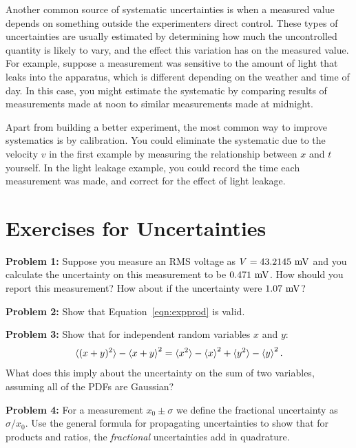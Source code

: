 \documentclass[12pt,oneside]{book}
\begin{document}
Another common source of systematic uncertainties is when a measured value depends on something outside the experimenters direct control.   These types of uncertainties are usually estimated by determining how much the uncontrolled quantity is likely to vary, and the effect this variation has on the measured value.  For example, suppose a measurement was sensitive to the amount of light that leaks into the apparatus, which is different depending on the weather and time of day.  In this case, you might estimate the systematic by comparing results of measurements made at noon to similar measurements made at midnight.

Apart from building a better experiment, the most common way to improve systematics is by calibration.  You could eliminate the systematic due to the velocity $v$ in the first example by measuring the relationship between $x$ and $t$ yourself.  In the light leakage example, you could record the time each measurement was made, and correct for the effect of light leakage.  

\section{Exercises for Uncertainties}


\noindent
{\bf Problem 1:}  Suppose you measure an RMS voltage as $V = 43.2145~\rm mV$ and you calculate the uncertainty on this measurement to be $0.471~\rm mV$.  How should you report this measurement?  How about if the uncertainty were $1.07~\rm mV$? \\ \vskip 0.25cm

\noindent
{\bf Problem 2:}  Show that Equation~\ref{eqn:expprod} is valid. \\ \vskip 0.25cm

\noindent
{\bf Problem 3:}  Show that for independent random variables $x$ and $y$:
\begin{displaymath}
\braket{(x+y)^2} - \braket{x+y}^2 = \braket{x^2} - \braket{x}^2 + \braket{y^2} - \braket{y}^2.
\end{displaymath}
What does this imply about the uncertainty on the sum of two variables, assuming all of the PDFs are Gaussian? \\ \vskip 0.25cm

\noindent
{\bf Problem 4:}  For a measurement $x_0 \pm \sigma$ we define the fractional uncertainty as $\sigma/x_0$.  Use the general formula for propagating uncertainties to show that for products and ratios, the {\em fractional} uncertainties add in quadrature.  \\ \vskip 0.25cm
\end{document}
